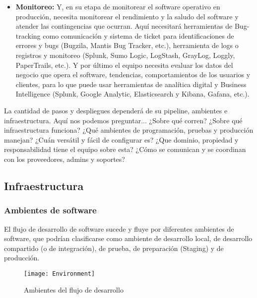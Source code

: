 \begin{itemize}
\item \textbf{Monitoreo:} Y, en su etapa de monitorear el software operativo en producción, necesita monitorear el rendimiento y la saludo del software y atender las contingencias que ocurran. Aquí necesitará herramientas de Bug-tracking como comunicación y sistema de ticket para identificaciones de errores y bugs (Bugzila, Mantis Bug Tracker, etc.), herramienta de logs o  registros y monitoreo (Splunk, Sumo Logic, LogStash, GrayLog, Loggly, PaperTrails, etc.). Y por último el equipo necesita evaluar los datos del negocio que opera el software, tendencias, comportamientos de los usuarios y clientes, para lo que puede usar herramientas de analítica digital y Business Intelligence (Splunk, Google Analytic, Elasticsearch y Kibana, Gafana, etc.).

\end{itemize}

La cantidad de pasos y despliegues dependerá de su pipeline, ambientes e infraestructura. Aquí nos podemos preguntar... ¿Sobre qué corren? ¿Sobre qué infraestructura funciona? ¿Qué ambientes de programación, pruebas y producción manejan? ¿Cuán versátil y fácil de configurar es? ¿Que dominio, propiedad y responsabilidad tiene el equipo sobre esta? ¿Cómo se comunican y se coordinan con los proveedores, admins y soportes?


\subsection{Infraestructura}


\subsubsection{Ambientes de software}
El flujo de desarrollo de software sucede y fluye por diferentes ambientes de software, que podrían clasificarse como ambiente de desarrollo local, de desarrollo compartido (o de integración), de prueba, de preparación (Staging) y de producción.

\begin{figure}[h]
  \centering
  \texttt{[image: Environment]}
  \caption{Ambientes del flujo de desarrollo}
  \centering
  \label{fig:Environment} %
\end{figure}
\FloatBarrier %


